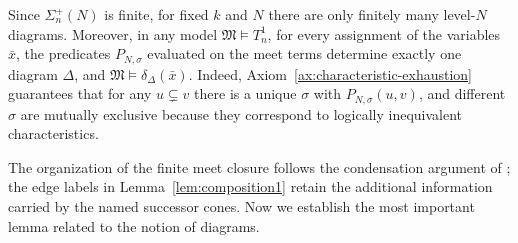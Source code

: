 \documentclass{amsart}
\theoremstyle{definition}
\begin{document}
Since $\Sigma_n^{+}(N)$ is finite, for fixed $k$ and $N$ there are only finitely many level-$N$ diagrams. Moreover, in any model $\mathfrak{M}\models T_n^1$, for every assignment of the variables $\bar{x}$, the predicates $P_{N,\sigma}$ evaluated on the meet terms determine exactly one diagram $\Delta$, and $\mathfrak{M}\models\delta_{\Delta}(\bar{x})$. Indeed, Axiom~\ref{ax:characteristic-exhaustion} guarantees that for any $u\subsetneq v$ there is a unique $\sigma$ with $P_{N,\sigma}(u,v)$, and different $\sigma$ are mutually exclusive because they correspond to logically inequivalent characteristics.

The organization of the finite meet closure follows the condensation argument of \cite[Lemma~5.1]{Kellerman2026}; the edge labels in Lemma~\ref{lem:composition1} retain the additional information carried by the named successor cones. Now we establish the most important lemma related to the notion of diagrams.
\end{document}
